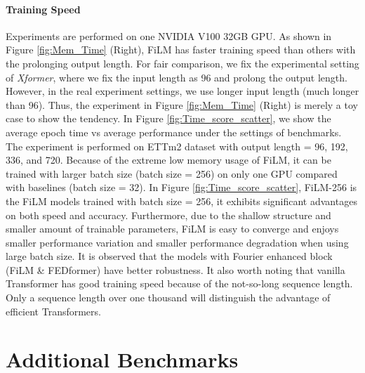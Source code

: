 \documentclass{article}
\begin{document}
\paragraph{Training Speed}
Experiments are performed on one NVIDIA V100 32GB GPU. As shown in Figure \ref{fig:Mem_Time} (Right), FiLM has faster training speed than others with the prolonging output length. For fair comparison, we fix the experimental setting of \textit{Xformer}, where we fix the input length as 96 and prolong the output length. However, in the real experiment settings, we use longer input length (much longer than 96). Thus, the experiment in Figure \ref{fig:Mem_Time} (Right) is merely a toy case to show the tendency. In Figure \ref{fig:Time_score_scatter}, we show the average epoch time vs average performance under the settings of benchmarks. The experiment is performed on ETTm2 dataset with output length = 96, 192, 336, and 720. Because of the extreme low memory usage of FiLM, it can be trained with larger batch size (batch size = 256) on only one GPU compared with baselines (batch size = 32). In Figure \ref{fig:Time_score_scatter}, FiLM-256 is the FiLM models trained with batch size = 256, it exhibits significant advantages on both speed and accuracy. Furthermore, due to the shallow structure and smaller amount of trainable parameters, FiLM is easy to converge and enjoys smaller performance variation and smaller performance degradation when using large batch size. It is observed that the models with Fourier enhanced block (FiLM \& FEDformer) have better robustness. It also worth noting that vanilla Transformer has good training speed because of the not-so-long sequence length. Only a sequence length over one thousand will distinguish the advantage of efficient Transformers.





 

\section{Additional Benchmarks}
\end{document}

